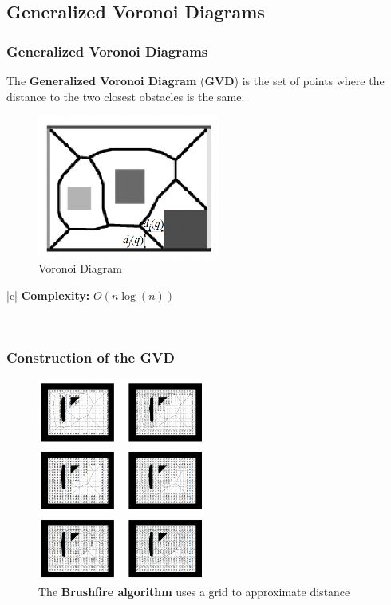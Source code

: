 \documentclass[handout]{beamer}
\newcommand\Tstrut{\rule{0pt}{2.6ex}}       %
\newcommand\Bstrut{\rule[-0.9ex]{0pt}{0pt}} %
\newcommand{\TBstrut}{\Tstrut\Bstrut} %
\begin{document}
  \subsection[Voronoi Diagrams]{Generalized Voronoi Diagrams}

  \begin{frame}
    \frametitle{Generalized Voronoi Diagrams}
    The \textbf{Generalized Voronoi Diagram} (\textbf{GVD}) is the set of points where the distance to the two closest obstacles is the same.
    \begin{center}
      \begin{figure}
        \includegraphics[width=60mm]{fig/fig_06_gvd.png}
        \caption{Voronoi Diagram}
        \label{fig:fig06}
      \end{figure}
     \end{center}
     \centering
     \begin{table}
       \begin{tblr}{|c|}
         \hline
         \textbf{Complexity:} $O(n \log(n))$ \TBstrut\\
         \hline
       \end{tblr}
     \end{table}
  
  \end{frame}

  \begin{frame}
    \frametitle{Construction of the GVD}
    \begin{center}
      \begin{figure}
        \includegraphics[width=55mm]{fig/fig_07_brushfire.png}
        \caption{The \textbf{Brushfire algorithm} uses a grid to approximate distance}
        \label{fig:fig07}
      \end{figure}
     \end{center}
  
  \end{frame}
\end{document}
